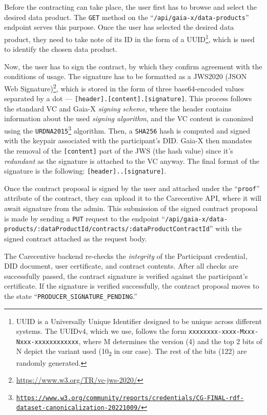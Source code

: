 Before the contracting can take place, the user first has to browse and select the desired data product.
The \texttt{GET} method on the ``\texttt{/api\-/gaia-x\-/data-products}'' endpoint serves this purpose.
Once the user has selected the desired data product, they need to take note of its ID in the form of a UUID\footnote{UUID is a Universally Unique Identifier designed to be unique across different systems. The UUIDv4, which we use, follows the form \texttt{xxxxxxxx-xxxx-Mxxx-Nxxx-xxxxxxxxxxxx}, where M determines the version (4) and the top 2 bits of N depict the variant used (10\textsubscript{2} in our case). The rest of the bits (122) are randomly generated.}, which is used to identify the chosen data product.

Now, the user has to sign the contract, by which they confirm agreement with the conditions of usage.
The signature has to be formatted as a JWS2020 (JSON Web Signature)\footnote{\url{https://www.w3.org/TR/vc-jws-2020/}}, which is stored in the form of three base64-encoded values separated by a dot --- \texttt{[header].[content].[signature]}.
This process follows the standard VC and Gaia-X \textit{signing scheme}, where the header contains information about the used \textit{signing algorithm}, and the VC content is canonized using the \texttt{URDNA2015\footnote{\url{https://www.w3.org/community/reports/credentials/CG-FINAL-rdf-dataset-canonicalization-20221009/}}} algorithm.
Then, a \texttt{SHA256} hash is computed and signed with the keypair associated with the participant's DID.
Gaia-X then mandates the removal of the \texttt{[content]} part of the JWS (the hash value) since it's \textit{redundant} as the signature is attached to the VC anyway.
The final format of the signature is the following: \texttt{[header]..[signature]}.

Once the contract proposal is signed by the user and attached under the ``\texttt{proof}'' attribute of the contract, they can upload it to the Carecentive API, where it will await signature from the admin.
This submission of the signed contract proposal is made by sending a \texttt{PUT} request to the endpoint ``\texttt{/api\-/gaia-x\-/data-products\-/:dataProductId\-/contracts\-/:dataProduct\-ContractId}'' with the signed contract attached as the request body.

The Carecentive backend re-checks the \textit{integrity} of the Participant credential, DID document, user certificate, and contract contents.
After all checks are successfully passed, the contract signature is verified against the participant's certificate.
If the signature is verified successfully, the contract proposal moves to the state ``\texttt{PRODUCER\_SIGNATURE\_PENDING}.''

